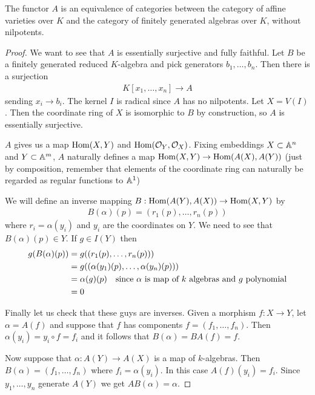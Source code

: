 \documentclass[12pt]{article}
\begin{document}
\begin{theorem}
    The functor $A$ is an equivalence of categories between the category of affine varieties over $K$ and the category of finitely generated algebras over $K$, without nilpotents.
\end{theorem}
\begin{proof}
We want to see that $A$ is essentially surjective and fully faithful. Let $B$ be a finitely generated reduced $K$-algebra and pick generators $b_1,\dots,b_n$. Then there is a surjection \begin{align*}
    K[x_1,\dots,x_n]\to A
\end{align*} sending $x_i\to b_i$. The kernel $I$ is radical since $A$ has no nilpotents. Let $X = V(I)$. Then the coordinate ring of $X$ is isomorphic to $B$ by construction, so $A$ is essentially surjective.

\hfill

$A$ gives us a map $\operatorname{Hom}(X,Y)$ and $\operatorname{Hom}(\mathcal{O}_Y,\mathcal{O}_X)$. Fixing embeddings $X\subset \mathbb{A}^n$ and $Y\subset \mathbb{A}^m$, $A$ naturally defines a map $\operatorname{Hom}(X,Y)\to\operatorname{Hom}(A(X),A(Y))$ (just by composition, remember that elements of the coordinate ring can naturally be regarded as regular functions to $\mathbb{A}^1$)

\hfill

We will define an inverse mapping $B:\operatorname{Hom}(A(Y),A(X))\to\operatorname{Hom}(X,Y)$ by \begin{align*}
    B(\alpha)(p) = (r_1(p),\dots,r_n(p))
\end{align*} where $r_i = \alpha(y_i)$ and $y_i$ are the coordinates on $Y$. We need to see that $B(\alpha)(p) \in Y$. If $g\in I(Y)$ then \begin{align*}
    g(B(\alpha)(p)) &= g((r_1(p),\dots,r_n(p))) \\
    &= g((\alpha(y_1)(p),\dots,\alpha(y_n)(p))) \\
    &= \alpha(g)(p) \text{\quad since $\alpha$ is map of $k$ algebras and $g$ polynomial} \\
    &= 0
\end{align*} 

\hfill

Finally let us check that these guys are inverses. Given a morphism $f:X\to Y$, let $\alpha = A(f)$ and suppose that $f$ has components $f = (f_1,\dots,f_n)$. Then $\alpha(y_i) = y_i\circ f = f_i$ and it follows that $B(\alpha) = BA(f) = f$.

\hfill 

Now suppose that $\alpha:A(Y)\to A(X)$ is a map of $k$-algebras. Then $B(\alpha) = (f_1,\dots,f_n)$ where $f_i = \alpha(y_i)$. In this case $A(f)(y_i) = f_i$. Since $y_1,\dots,y_n$ generate $A(Y)$ we get $AB(\alpha) = \alpha$.
\end{proof}
\end{document}
